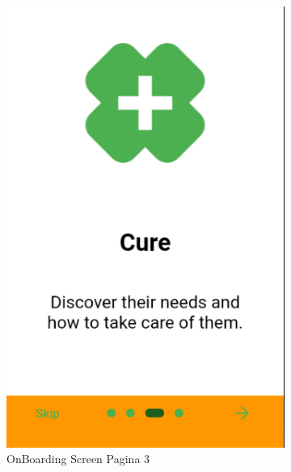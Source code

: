 \documentclass[a4paper,12pt]{report}
\begin{document}
\begin{figure}[H]
\begin{subfigure}{0.3\textwidth}
	\includegraphics[width=\textwidth]{./images/onboarding/onboarding_screen2.png}
	\caption{OnBoarding Screen Pagina 3}
	\label{fig:onboarding2}
\end{subfigure}
\hfill
\begin{subfigure}{0.3\textwidth}

\end{subfigure}
\end{figure}
\end{document}
